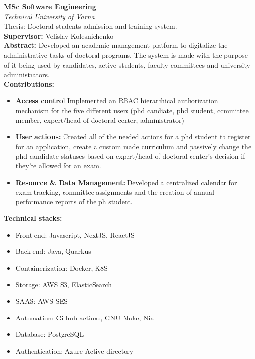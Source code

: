 \textbf{MSc Software Engineering}  \\
\textit{Technical University of Varna} \\
\footnotesize Thesis: Doctoral students admission and training system. \\
\textbf{Supervisor:} Velislav Kolesnichenko \\
\textbf{Abstract:} Developed an academic management platform to digitalize the administrative tasks of doctoral programs. The system is made with the purpose of it being used by candidates, active students, faculty committees and university administrators. \\
\textbf{Contributions:}
\begin{itemize}[label=\tiny$\bullet$, leftmargin=1em, nosep]
	\item \textbf{Access control} Implemented an RBAC hierarchical authorization mechanism for the five different users (phd candiate, phd student, committee member, expert/head of doctoral center, administrator)
	\item \textbf{User actions:} Created all of the needed actions for a phd student to register for an application, create a custom made curriculum and passively change the phd candidate statuses based on expert/head of doctoral center's decision if they're allowed for an exam.
	\item \textbf{Resource \& Data Management:} Developed a centralized calendar for exam tracking, committee assignments and the creation of annual performance reports of the ph student.
\end{itemize}


\noindent \textbf{Technical stacks:}
\begin{itemize}[label=\tiny$\bullet$, leftmargin=1em]
	\item Front-end: Javascript, NextJS, ReactJS
	\item Back-end: Java, Quarkus
	\item Containerization: Docker, K8S
	\item Storage: AWS S3, ElasticSearch
	\item SAAS: AWS SES
	\item Automation: Github actions, GNU Make, Nix
	\item Database: PostgreSQL
	\item Authentication: Azure Active directory
\end{itemize}

